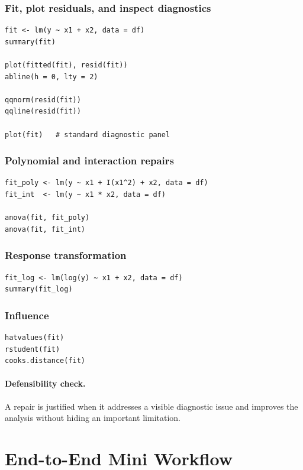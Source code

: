 \subsubsection*{Fit, plot residuals, and inspect diagnostics}

\begin{verbatim}
fit <- lm(y ~ x1 + x2, data = df)
summary(fit)

plot(fitted(fit), resid(fit))
abline(h = 0, lty = 2)

qqnorm(resid(fit))
qqline(resid(fit))

plot(fit)   # standard diagnostic panel
\end{verbatim}

\subsubsection*{Polynomial and interaction repairs}

\begin{verbatim}
fit_poly <- lm(y ~ x1 + I(x1^2) + x2, data = df)
fit_int  <- lm(y ~ x1 * x2, data = df)

anova(fit, fit_poly)
anova(fit, fit_int)
\end{verbatim}

\subsubsection*{Response transformation}

\begin{verbatim}
fit_log <- lm(log(y) ~ x1 + x2, data = df)
summary(fit_log)
\end{verbatim}

\subsubsection*{Influence}

\begin{verbatim}
hatvalues(fit)
rstudent(fit)
cooks.distance(fit)
\end{verbatim}

\paragraph{Defensibility check.} A repair is justified when it addresses a visible diagnostic issue and improves the analysis without hiding an important limitation.

\section{End-to-End Mini Workflow}
\label{app:cookbook-end-to-end-mini-workflow}

